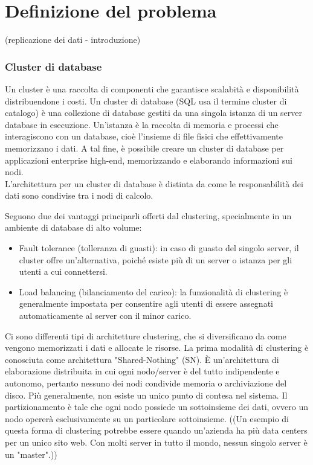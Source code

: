 %
\chapter{Definizione del problema}
\setcounter{section}{1}
(replicazione dei dati - introduzione)
\subsection{Cluster di database}
Un cluster \`{e} una raccolta di componenti che garantisce scalabit\`{a} e disponibilit\`{a} distribuendone i costi. Un cluster di database (SQL usa il termine cluster di catalogo) \`{e} una collezione di database gestiti da una singola istanza di un server database in esecuzione. Un'istanza \`{e} la raccolta di memoria e processi che interagiscono con un database, cio\`{e} l'insieme di file fisici che effettivamente memorizzano i dati.\cite{etichetta1} A tal fine, \`{e} possibile creare un cluster di database per applicazioni enterprise high-end, memorizzando e elaborando informazioni sui nodi.\\ L'architettura per un cluster di database \`{e} distinta da come le responsabilit\`{a} dei dati sono condivise tra i nodi di calcolo.

Seguono due dei vantaggi principarli offerti dal clustering, specialmente in un ambiente di database di alto volume:
\begin{itemize}
\item 
Fault tolerance (tolleranza di guasti): in caso di guasto del singolo server, il cluster offre un'alternativa, poich\'{e} esiste pi\`{u} di un server o istanza per gli utenti a cui connettersi.
\item
Load balancing (bilanciamento del carico): la funzionalit\`{a} di clustering \`{e} generalmente impostata per consentire agli utenti di essere assegnati automaticamente al server con il minor carico.\cite{etichetta1} 
\end{itemize}
Ci sono differenti tipi di architetture clustering, che si diversificano da come vengono memorizzati i dati e allocate le risorse.
La prima modalit\`{a} di clustering \`{e} conosciuta come architettura "Shared-Nothing" (SN). \`{E} un'architettura di elaborazione distribuita in cui ogni nodo/server \`{e} del tutto indipendente e autonomo, pertanto nessuno dei nodi condivide memoria o archiviazione del disco. Pi\`{u} generalmente, non esiste un unico punto di contesa nel sistema.\cite{etichetta5} Il partizionamento \`{e} tale che ogni nodo possiede un sottoinsieme dei dati, ovvero un nodo operer\`{a} esclusivamente su un particolare sottoinsieme. 
((Un esempio di questa forma di clustering potrebbe essere quando un'azienda ha pi\`{u} data centers per un unico sito web. Con molti server in tutto il mondo, nessun singolo server \`{e} un "master".))\\

